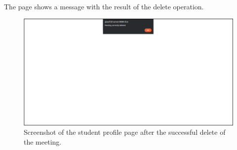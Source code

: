 The page shows a message with the result of the delete operation.\\

\begin{figure}[H]
    \centering
     \includegraphics[width=1\textwidth]{img/user_manual/student/profile-alert.png}
    \caption{\label{fig:student-profile-3} Screenshot of the student profile page after the successful delete of the meeting.}
\end{figure}